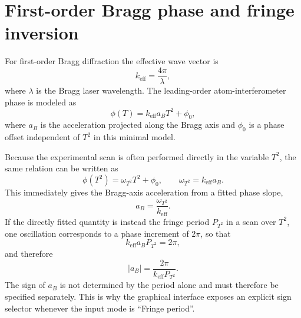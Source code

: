 \documentclass[11pt]{article}
\begin{document}
\section{First-order Bragg phase and fringe inversion}

For first-order Bragg diffraction the effective wave vector is
\begin{equation}
 k_{\mathrm{eff}} = \frac{4\pi}{\lambda},
\end{equation}
where $\lambda$ is the Bragg laser wavelength. The leading-order atom-interferometer phase is modeled as
\begin{equation}
 \phi(T) = k_{\mathrm{eff}} a_B T^2 + \phi_0,
 \label{eq:phase_model}
\end{equation}
where $a_B$ is the acceleration projected along the Bragg axis and $\phi_0$ is a phase offset independent of $T^2$ in this minimal model.

Because the experimental scan is often performed directly in the variable $T^2$, the same relation can be written as
\begin{equation}
 \phi(T^2) = \omega_{T^2} T^2 + \phi_0,
 \qquad
 \omega_{T^2} = k_{\mathrm{eff}} a_B.
 \label{eq:phase_slope}
\end{equation}
This immediately gives the Bragg-axis acceleration from a fitted phase slope,
\begin{equation}
 a_B = \frac{\omega_{T^2}}{k_{\mathrm{eff}}}.
 \label{eq:beam_from_omega}
\end{equation}
If the directly fitted quantity is instead the fringe period $P_{T^2}$ in a scan over $T^2$, one oscillation corresponds to a phase increment of $2\pi$, so that
\begin{equation}
 k_{\mathrm{eff}} a_B P_{T^2} = 2\pi,
\end{equation}
and therefore
\begin{equation}
 \left|a_B\right| = \frac{2\pi}{k_{\mathrm{eff}} P_{T^2}}.
 \label{eq:beam_from_period}
\end{equation}
The sign of $a_B$ is not determined by the period alone and must therefore be specified separately. This is why the graphical interface exposes an explicit sign selector whenever the input mode is ``Fringe period''.
\end{document}
